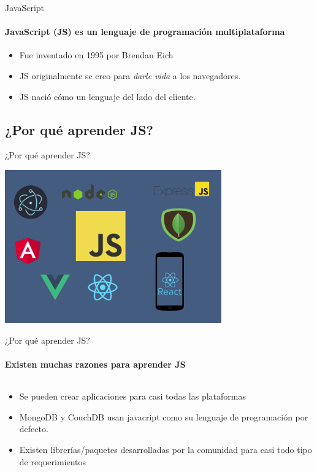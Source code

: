 \documentclass[aspectratio=169]{beamer}
\begin{document}
\begin{darkframes}
    \begin{frame}[label=javascript]{JavaScript}
      \framesubtitle{\alert{JavaScript (JS) es un lenguaje de programación} multiplataforma}%
      \begin{itemize}
        \item Fue inventado en 1995 por Brendan Eich
        \item JS originalmente se creo para \textit{darle vida} a los navegadores.
        \item JS nació cómo un lenguaje del lado del cliente.
      \end{itemize}
    \end{frame}

    \subsection{¿Por qué aprender JS?}

    \begin{frame}{¿Por qué aprender JS?}
      \begin{center}
        \includegraphics[width=0.7\textwidth]{jslearn}
      \end{center}
    \end{frame}

    \begin{frame}{¿Por qué aprender JS?}
      \framesubtitle{Existen muchas razones para aprender JS}

      \begin{columns}[T]
        \begin{column}{.5\textwidth}
          \begin{itemize}
            \item Se pueden crear aplicaciones para casi todas las plataformas
            \item MongoDB y CouchDB usan javacript como su lenguaje de programación por defecto.
            \item Existen librerías/paquetes desarrolladas por la comunidad para casi todo tipo de requerimientos
          \end{itemize}
        \end{column}


\end{columns}
\end{frame}
\end{darkframes}
\end{document}
